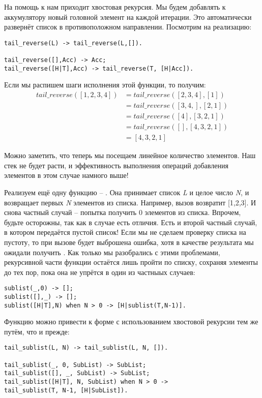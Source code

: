 На помощь к нам приходит хвостовая рекурсия.
Мы будем добавлять к аккумулятору новый головной элемент на каждой итерации.
Это автоматически развернёт список в противоположном направлении.
Посмотрим на реализацию:
\begin{lstlisting}[style=erlang]
tail_reverse(L) -> tail_reverse(L,[]).
 
tail_reverse([],Acc) -> Acc;
tail_reverse([H|T],Acc) -> tail_reverse(T, [H|Acc]).
\end{lstlisting}

Если мы распишем шаги исполнения этой функции, то получим:
\begin{align*}
tail\_reverse([1,2,3,4]) &= tail\_reverse([2,3,4], [1])\\
&= tail\_reverse([3,4,], [2,1])\\
&= tail\_reverse([4], [3,2,1])\\
&= tail\_reverse([], [4,3,2,1])\\
&= [4,3,2,1]
\end{align*}

Можно заметить, что теперь мы посещаем линейное количество элементов.
Наш стек не будет расти, и эффективность выполнения операций добавления элементов в этом случае намного выше!

Реализуем ещё одну функцию \--- . Она принимает список \emph{L} и целое число \emph{N}, и возвращает первых \emph{N} элементов из списка.
Например, вызов  возвратит [1,2,3].
И снова частный случай \--- попытка получить 0 элементов из списка.
Впрочем, будьте осторожны, так как в случае  есть отличия.
Есть и второй частный случай, в котором передаётся пустой список!
Если мы не сделаем проверку списка на пустоту, то при вызове  будет выброшена ошибка, хотя в качестве результата мы ожидали получить \ops{[1]}.
Как только мы разобрались с этими проблемами, рекурсивной части функции остаётся лишь пройти по списку, сохраняя элементы до тех пор, пока она не упрётся в один из частныых случаев:
\begin{lstlisting}[style=erlang]
sublist(_,0) -> [];
sublist([],_) -> [];
sublist([H|T],N) when N > 0 -> [H|sublist(T,N-1)].
\end{lstlisting}

Функцию можно привести к форме с использованием хвостовой рекурсии тем же путём, что и прежде:
\begin{lstlisting}[style=erlang]
tail_sublist(L, N) -> tail_sublist(L, N, []).
 
tail_sublist(_, 0, SubList) -> SubList;
tail_sublist([], _, SubList) -> SubList;
tail_sublist([H|T], N, SubList) when N > 0 ->
tail_sublist(T, N-1, [H|SubList]).
\end{lstlisting}

